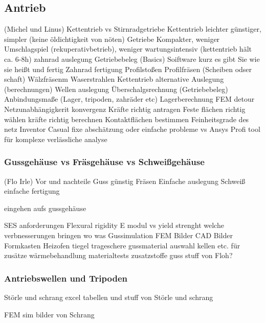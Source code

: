 \subsection{Antrieb} (Michel und Linus)
Kettentrieb vs Stirnradgetriebe
	Kettentrieb leichter günstiger, simpler (keine öldichtigkeit von nöten)
	Getriebe Kompakter, weniger Umschlagspiel (rekuperativbetrieb), weniger wartungsintensiv (kettentrieb hält ca. 6-8h)
zahnrad auslegung
	Getriebebeleg (Basics)
	Soiftware kurz es gibt Sie wie sie heißt und fertig
Zahnrad fertigung
	Profilstoßen
	Profilfräsen (Scheiben odser schaft)
	Wälzfräsenm
	Waserstrahlen
Kettentrieb alternative
	Auslegung (berechnungen)
Wellen auslegung
	Überschalgsrechnung (Getriebebeleg) 
	Anbindungsmaße (Lager, tripoden, zahräder etc)
Lagerberechnung
FEM detour
	Netzunabhängigkerit
	konvergenz
	Kräfte richtig antragen
	Feste flächen richtig wählen
	kräfte richtig berechnen
	Kontaktflächen bestimmen
	Feinheitsgrade des netz
	Inventor Casual fixe abschätzung oder einfache probleme vs Ansys Profi tool für komplexe verlässliche analyse

\subsubsection{Gussgehäuse vs Fräsgehäuse vs Schweißgehäuse} (Flo Irle)
Vor und nachteile
	Guss günstig
	Fräsen Einfache auslegung
	Schweiß einfache fertigung
	

eingehen aufs gussgehäuse

SES anforderungen
Flexural rigidity
E modul vs yield strenght welche verbnesserungen bringen wo was
Gussimulation
FEM Bilder
CAD Bilder
Formkasten
Heizofen
tiegel
trageschere
gussmaterial auswahl
kellen etc. für zusätze
wärmebehandlung
materialtests
zusatzstoffe guss
stuff von Floh?

\subsubsection{Antriebswellen und Tripoden} Störle und schrang
excel tabellen und stuff von Störle und schrang

FEM sim bilder von Schrang
